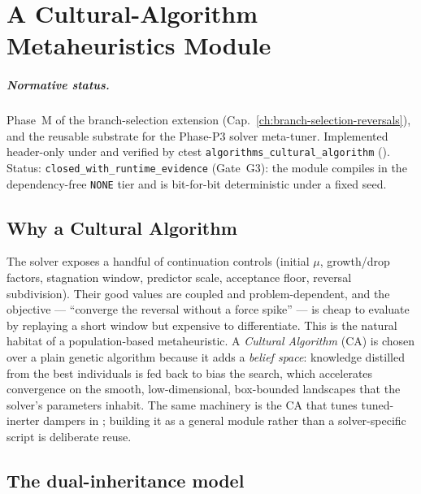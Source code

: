 
\chapter{A Cultural-Algorithm Metaheuristics Module}
\label{ch:cultural-algorithm-module}

\paragraph{Normative status.}
Phase~M of the branch-selection extension
(Cap.~\ref{ch:branch-selection-reversals}), and the reusable substrate for
the Phase-P3 solver meta-tuner. Implemented header-only under
 and verified by ctest
\texttt{algorithms\_cultural\_algorithm}
(). Status:
\texttt{closed\_with\_runtime\_evidence} (Gate~G3): the module compiles in
the dependency-free \texttt{NONE} tier and is bit-for-bit deterministic
under a fixed seed.

\section{Why a Cultural Algorithm}

The solver exposes a handful of continuation controls (initial \(\mu\),
growth/drop factors, stagnation window, predictor scale, acceptance
floor, reversal subdivision). Their good values are coupled and
problem-dependent, and the objective --- ``converge the reversal without
a force spike'' --- is cheap to evaluate by replaying a short window but
expensive to differentiate. This is the natural habitat of a
population-based metaheuristic. A \emph{Cultural Algorithm} (CA)
\cite{Reynolds1994Cultural,ReynoldsPeng2004} is chosen over a plain
genetic algorithm because it adds a \emph{belief space}: knowledge
distilled from the best individuals is fed back to bias the search,
which accelerates convergence on the smooth, low-dimensional,
box-bounded landscapes that the solver's parameters inhabit. The same
machinery is the CA that tunes tuned-inerter dampers in
\cite{LaraValenciaEchavarriaValencia2024}; building it as a general
module rather than a solver-specific script is deliberate reuse.

\section{The dual-inheritance model}

